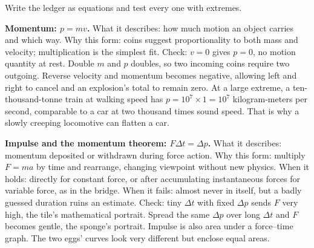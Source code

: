 
Write the ledger as equations and test every one with extremes.

\textbf{Momentum: \(p=mv\).} What it describes: how much motion an object carries and which way. Why this form: coins suggest proportionality to both mass and velocity; multiplication is the simplest fit. Check: \(v=0\) gives \(p=0\), no motion quantity at rest. Double \(m\) and \(p\) doubles, so two incoming coins require two outgoing. Reverse velocity and momentum becomes negative, allowing left and right to cancel and an explosion's total to remain zero. At a large extreme, a ten-thousand-tonne train at walking speed has \(p=10^{7}\times1=10^{7}\) kilogram-meters per second, comparable to a car at two thousand times sound speed. That is why a slowly creeping locomotive can flatten a car.

\textbf{Impulse and the momentum theorem: \(F\Delta t=\Delta p\).} What it describes: momentum deposited or withdrawn during force action. Why this form: multiply \(F=ma\) by time and rearrange, changing viewpoint without new physics. When it holds: directly for constant force, or after accumulating instantaneous forces for variable force, as in the bridge. When it fails: almost never in itself, but a badly guessed duration ruins an estimate. Check: tiny \(\Delta t\) with fixed \(\Delta p\) sends \(F\) very high, the tile's mathematical portrait. Spread the same \(\Delta p\) over long \(\Delta t\) and \(F\) becomes gentle, the sponge's portrait. Impulse is also area under a force--time graph. The two eggs' curves look very different but enclose equal areas.

\begin{center}
\end{center}


